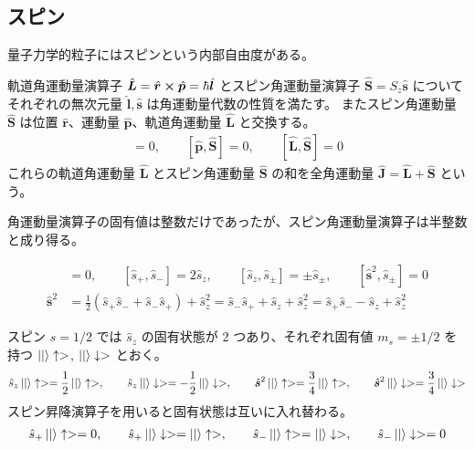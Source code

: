 \documentclass[uplatex,dvipdfmx,a4paper,11pt]{jlreq}
\newcommand{\rr}{\bm{r}}
\newcommand{\pp}{\bm{p}}
\numberwithin{equation}{section}
\theoremstyle{definition}
\begin{document}
\subsection{スピン}
量子力学的粒子にはスピンという内部自由度がある。
\begin{definition}[軌道角運動量とスピン角運動量]
  軌道角運動量演算子 $\hat{\bm{L}} = \hat{\rr}\cross\hat{\pp} = \hbar\hat{\bm{l}}$ とスピン角運動量演算子 $\hat{\bm{S}} = S_z\hat{\bm{s}}$ についてそれぞれの無次元量 $\hat{\bm{l}}, \hat{\bm{s}}$ は角運動量代数の性質を満たす。
  またスピン角運動量 $\hat{\bm{S}}$ は位置 $\hat{\rr}$、運動量 $\hat{\pp}$、軌道角運動量 $\hat{\bm{L}}$ と交換する。
  \begin{align}
    [\hat{\rr}, \hat{\bm{S}}] = 0, \qquad [\hat{\pp}, \hat{\bm{S}}] = 0, \qquad [\hat{\bm{L}}, \hat{\bm{S}}] = 0
  \end{align}
  これらの軌道角運動量 $\hat{\bm{L}}$ とスピン角運動量 $\hat{\bm{S}}$ の和を全角運動量 $\hat{\bm{J}} = \hat{\bm{L}} + \hat{\bm{S}}$ という。
\end{definition}
角運動量演算子の固有値は整数だけであったが、スピン角運動量演算子は半整数と成り得る。
\begin{proposition}
  \begin{align}
    [\hat{\bm{s}}^2, \hat{s}_z] & = 0, \qquad [\hat{s}_+, \hat{s}_-] = 2\hat{s}_z, \qquad [\hat{s}_z, \hat{s}_\pm] = \pm \hat{s}_\pm, \qquad [\hat{\bm{s}}^2, \hat{s}_\pm] = 0                       \\
    \hat{\bm{s}}^2              & = \frac{1}{2}(\hat{s}_+\hat{s}_- + \hat{s}_-\hat{s}_+) + \hat{s}_z^2 = \hat{s}_-\hat{s}_+ + \hat{s}_z + \hat{s}_z^2 = \hat{s}_+\hat{s}_- - \hat{s}_z + \hat{s}_z^2
  \end{align}
\end{proposition}

\begin{proposition}
  スピン $s = 1/2$ では $\hat{s}_z$ の固有状態が 2 つあり、それぞれ固有値 $m_s = \pm1/2$ を持つ $\ket|\uparrow>$, $\ket|\downarrow>$ とおく。
  \begin{align}
    \hat{s}_z\ket|\uparrow> = \frac{1}{2}\ket|\uparrow>, \qquad \hat{s}_z\ket|\downarrow> = -\frac{1}{2}\ket|\downarrow>, \qquad \hat{\bm{s}}^2\ket|\uparrow> = \frac{3}{4}\ket|\uparrow>, \qquad \hat{\bm{s}}^2\ket|\downarrow> = \frac{3}{4}\ket|\downarrow>
  \end{align}
  スピン昇降演算子を用いると固有状態は互いに入れ替わる。
  \begin{align}
    \hat{s}_+\ket|\uparrow> = 0, \qquad \hat{s}_+\ket|\downarrow> = \ket|\uparrow>, \qquad \hat{s}_-\ket|\uparrow> = \ket|\downarrow>, \qquad \hat{s}_-\ket|\downarrow> = 0
  \end{align}
\end{proposition}
\end{document}
